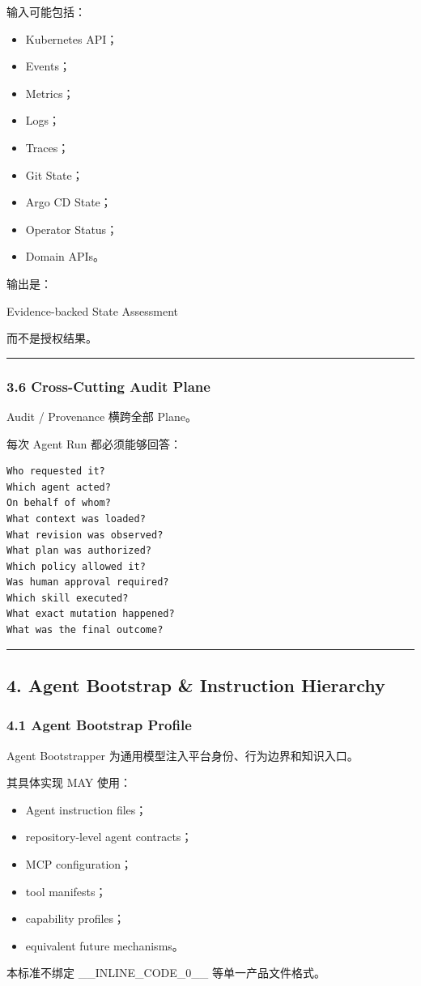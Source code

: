 \documentclass[11pt,a4paper]{article}
\begin{document}
输入可能包括：

\begin{itemize}
  \item Kubernetes API；
  \item Events；
  \item Metrics；
  \item Logs；
  \item Traces；
  \item Git State；
  \item Argo CD State；
  \item Operator Status；
  \item Domain APIs。
\end{itemize}
输出是：

\begin{gfmBlockquote}
Evidence-backed State Assessment
\end{gfmBlockquote}
而不是授权结果。

\vspace{0.5em}\hrule\vspace{0.5em}
\subsubsection{3.6 Cross-Cutting Audit Plane}
Audit / Provenance 横跨全部 Plane。

每次 Agent Run 都必须能够回答：

\begin{lstlisting}[language=text]
Who requested it?
Which agent acted?
On behalf of whom?
What context was loaded?
What revision was observed?
What plan was authorized?
Which policy allowed it?
Was human approval required?
Which skill executed?
What exact mutation happened?
What was the final outcome?
\end{lstlisting}
\vspace{0.5em}\hrule\vspace{0.5em}
\subsection{4. Agent Bootstrap \& Instruction Hierarchy}
\subsubsection{4.1 Agent Bootstrap Profile}
Agent Bootstrapper 为通用模型注入平台身份、行为边界和知识入口。

其具体实现 MAY 使用：

\begin{itemize}
  \item Agent instruction files；
  \item repository-level agent contracts；
  \item MCP configuration；
  \item tool manifests；
  \item capability profiles；
  \item equivalent future mechanisms。
\end{itemize}
本标准不绑定 \_\_INLINE\_CODE\_0\_\_ 等单一产品文件格式。
\end{document}

